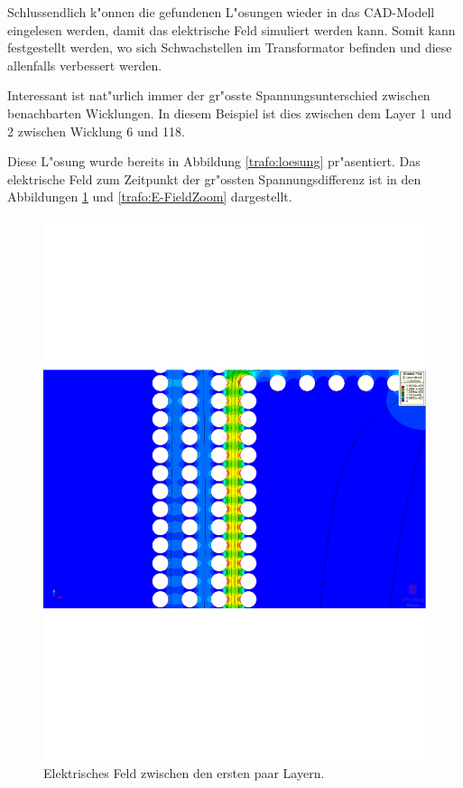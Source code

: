 \begin{refsection}
Schlussendlich k"onnen die gefundenen L"osungen wieder in das CAD-Modell eingelesen werden, damit das elektrische Feld simuliert werden kann. Somit kann festgestellt werden, wo sich Schwachstellen im Transformator befinden und diese allenfalls verbessert werden.

Interessant ist nat"urlich immer der gr"osste Spannungsunterschied zwischen benachbarten Wicklungen. In diesem Beispiel ist dies zwischen dem Layer 1 und 2 zwischen Wicklung 6 und 118.

Diese L"osung wurde bereits in Abbildung \ref{trafo:loesung} pr"asentiert. Das elektrische Feld zum Zeitpunkt der gr"ossten Spannungsdifferenz ist in den Abbildungen \ref{trafo:E-Field} und \ref{trafo:E-FieldZoom} dargestellt. 

\begin{figure}
	\centering
	\includegraphics[width=\textwidth]{./trafo/images/BIL_VoltageTrans.pdf}
	\caption{Elektrisches Feld zwischen den ersten paar Layern.}
	\label{trafo:E-Field}
\end{figure}


\end{refsection}
